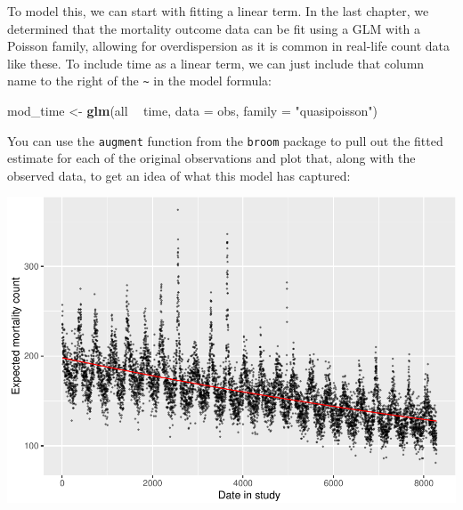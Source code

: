 \documentclass[
]{book}
\newenvironment{Shaded}{\begin{snugshade}}{\end{snugshade}}
\newcommand{\DataTypeTok}[1]{\textcolor[rgb]{0.13,0.29,0.53}{#1}}
\newcommand{\FloatTok}[1]{\textcolor[rgb]{0.00,0.00,0.81}{#1}}
\newcommand{\KeywordTok}[1]{\textcolor[rgb]{0.13,0.29,0.53}{\textbf{#1}}}
\newcommand{\NormalTok}[1]{#1}
\newcommand{\OperatorTok}[1]{\textcolor[rgb]{0.81,0.36,0.00}{\textbf{#1}}}
\newcommand{\StringTok}[1]{\textcolor[rgb]{0.31,0.60,0.02}{#1}}
\begin{document}
To model this, we can start with fitting a linear term. In the last chapter,
we determined that the mortality outcome data can be fit using a GLM with a
Poisson family, allowing for overdispersion as it is common in real-life
count data like these. To include time as a linear term, we can just include
that column name to the right of the \texttt{\textasciitilde{}} in the model formula:

\begin{Shaded}
\begin{Highlighting}[]
\NormalTok{mod_time <-}\StringTok{ }\KeywordTok{glm}\NormalTok{(all }\OperatorTok{~}\StringTok{ }\NormalTok{time, }
                \DataTypeTok{data =}\NormalTok{ obs, }\DataTypeTok{family =} \StringTok{"quasipoisson"}\NormalTok{)}
\end{Highlighting}
\end{Shaded}

You can use the \texttt{augment} function from the \texttt{broom} package to pull out the
fitted estimate for each of the original observations and plot that, along
with the observed data, to get an idea of what this model has captured:

\begin{Shaded}
\end{Shaded}

\includegraphics{adv_epi_analysis_files/figure-latex/unnamed-chunk-50-1.pdf}
\end{document}
